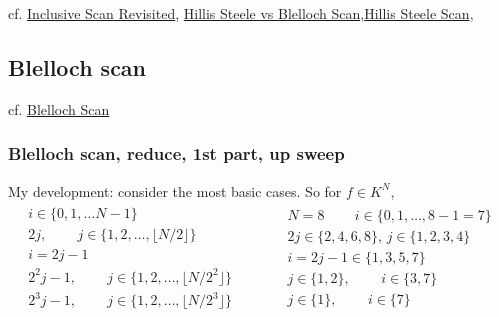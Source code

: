 \documentclass[10pt]{amsart}
\begin{document}
\begin{multicols*}{2}
cf. \href{https://classroom.udacity.com/courses/cs344/lessons/86719951/concepts/880351210923#}{Inclusive Scan Revisited}, \href{https://classroom.udacity.com/courses/cs344/lessons/86719951/concepts/873907230923#}{Hillis Steele vs Blelloch Scan},\href{https://classroom.udacity.com/courses/cs344/lessons/86719951/concepts/880351220923#}{Hillis Steele Scan},


\subsection{Blelloch scan}
cf. \href{https://classroom.udacity.com/courses/cs344/lessons/86719951/concepts/880351240923#}{Blelloch Scan}

\subsubsection{Blelloch scan, reduce, 1st part, up sweep } 

My development: consider the most basic cases.  So for $f\in K^N$,
\[
\begin{gathered}
  \begin{gathered}
    i \in \lbrace 0 , 1 , \dots N -1 \rbrace   \\
    2j, \qquad \, j \in \lbrace 1 , 2 , \dots, \lfloor N/2 \rfloor  \rbrace  \\
    i = 2j - 1  \\
    2^2 j - 1 , \qquad \, j\in \lbrace 1 ,2, \dots , \lfloor N/2^2 \rfloor \rbrace \\
    2^3j -1 , \qquad \, j \in \lbrace 1  , 2 , \dots , \lfloor N/2^3 \rfloor \rbrace 
    \end{gathered}
\qquad \quad \, \begin{gathered}
  N = 8 \qquad \, i \in \lbrace 0 , 1 , \dots, 8  - 1 = 7 \rbrace  \\
  2j \in \lbrace 2 ,4 , 6 , 8 \rbrace, \, j \in \lbrace 1,2,3,4 \rbrace \\ 
  i = 2j - 1 \in \lbrace 1,3,5,7 \rbrace \\
  j \in \lbrace 1 , 2 \rbrace , \qquad \, i \in \lbrace 3 , 7 \rbrace \\
  j\in \lbrace 1 \rbrace , \qquad \, i \in \lbrace 7 \rbrace
  \end{gathered}
\end{gathered}
\]


\end{multicols*}
\end{document}
